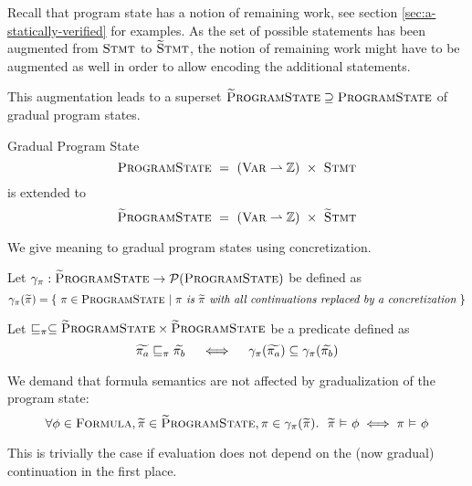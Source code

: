 Recall that program state has a notion of remaining work, see section \ref{sec:a-statically-verified} for examples.
As the set of possible statements has been augmented from $\textup{\textsc{Stmt}}$ to $\textup{\textsc{\ensuremath{\widetilde{\text{S}}}tmt}}$, the notion of remaining work might have to be augmented as well in order to allow encoding the additional statements.

This augmentation leads to a superset $\textup{\textsc{\ensuremath{\widetilde{\text{P}}}rogramState}} \supseteq \textup{\textsc{ProgramState}}$ of gradual program states.
\begin{example}{Gradual Program State}
$$\textup{\textsc{ProgramState}} ~  =~ (\textup{\textsc{Var}} \rightharpoonup \mathbb{Z}) ~\times~ \textup{\textsc{Stmt}}$$
is extended to
$$\textup{\textsc{\ensuremath{\widetilde{\text{P}}}rogramState}} ~ =~ (\textup{\textsc{Var}} \rightharpoonup \mathbb{Z}) ~\times~ \textup{\textsc{\ensuremath{\widetilde{\text{S}}}tmt}}$$
\end{example}

We give meaning to gradual program states using concretization.
\begin{definition}
    Let $\gamma_{\pi} : \textup{\textsc{\ensuremath{\widetilde{\text{P}}}rogramState}} \rightarrow \mathcal{P}(\textup{\textsc{ProgramState}})$ be defined as
    \begin{displaymath}
    \gamma_{\pi}(\widetilde{\pi}) = \{~ \pi \in \textup{\textsc{ProgramState}} ~|~ \textit{$\pi$ is $\widetilde{\pi}$ with all continuations replaced by a concretization} ~\}
    \end{displaymath} 
\end{definition}
\begin{definition}
    Let $\sqsubseteq_{\pi} \subseteq \textup{\textsc{\ensuremath{\widetilde{\text{P}}}rogramState}} \times \textup{\textsc{\ensuremath{\widetilde{\text{P}}}rogramState}}$ be a predicate defined as
    $$\widetilde{\pi_a} \sqsubseteq_{\pi} \widetilde{\pi_b}  \quad\iff\quad  \gamma_{\pi}(\widetilde{\pi_a}) \subseteq \gamma_{\pi}(\widetilde{\pi_b})$$
\end{definition}

\begin{comment}
Consequence:
\begin{displaymath}
\forall \grad{\pi_{\grad{s}}} \in \setGProgramState_{\grad{s}}, \pi \in \gamma_{\pi}(\grad{\pi_{\grad{s}}}).~ \exists s \in \gamma_s(\grad{s}).~ \pi \in \setProgramState_s
\end{displaymath}
\end{comment}

\begin{lemma}
    \label{lemma:gradPS-form-sem}
    We demand that formula semantics are not affected by gradualization of the program state:
    \begin{displaymath}
    \forall \phi \in \textup{\textsc{Formula}}, \widetilde{\pi} \in \textup{\textsc{\ensuremath{\widetilde{\text{P}}}rogramState}}, \pi \in \gamma_{\pi}(\widetilde{\pi}).~~ \widetilde{\pi} \,\,{\vDash}\,\, \phi \iff \pi \,\,{\vDash}\,\, \phi
    \end{displaymath}
    
    This is trivially the case if evaluation does not depend on the (now gradual) continuation in the first place.
\end{lemma}

